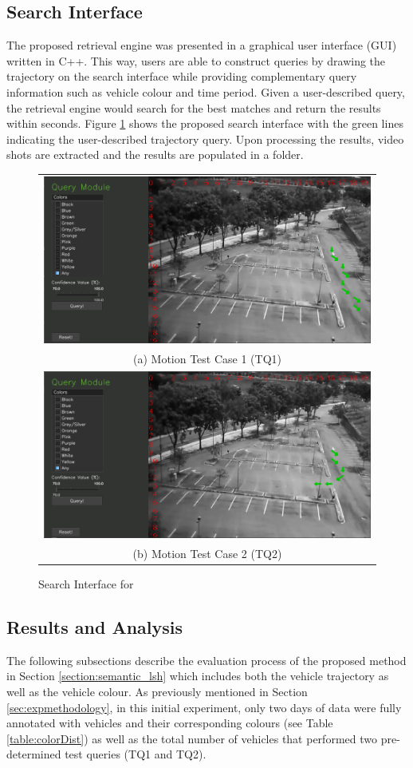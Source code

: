 \subsection{Search Interface}

The proposed retrieval engine was presented in a graphical user interface (GUI) written in C++. This way, users are able to construct queries by drawing the trajectory on the search interface while providing complementary query information such as vehicle colour and time period. Given a user-described query, the retrieval engine would search for the best matches and return the results within seconds. Figure \ref{fig:versionOneInterface} shows the proposed search interface with the green lines indicating the user-described trajectory query. Upon processing the results, video shots are extracted and the results are populated in a folder.
\begin{figure}[!tb]
	\centering
	\begin{tabular}{c}
		\includegraphics[width=0.7\linewidth]{image/retrievalOne/test1-8inputs.PNG} \\
		(a) Motion Test Case 1 (TQ1) \\
		\includegraphics[width=0.7\linewidth]{image/retrievalOne/test2-6input.PNG}\\
		(b) Motion Test Case 2 (TQ2)
	\end{tabular}
	\caption{Search Interface for \versionOneRet}
	\label{fig:versionOneInterface}
\end{figure}

\subsection{Results and Analysis}
The following subsections describe the evaluation process of the proposed method in Section \ref{section:semantic_lsh} which includes both the vehicle trajectory as well as the vehicle colour. As previously mentioned in Section \ref{sec:expmethodology}, in this initial experiment, only two days of data were fully annotated with vehicles and their corresponding colours (see Table
\ref{table:colorDist}) as well as the total number of vehicles that performed two pre-determined test queries (TQ1 and TQ2).

